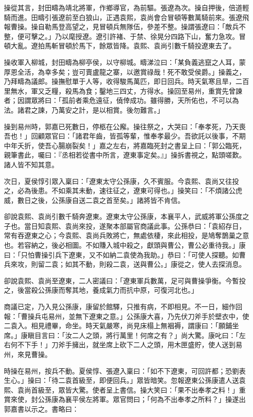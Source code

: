 操從其言，封田疇為靖北將軍，作鄉導官，為前驅。張遼為次。操自押後，倍道輕騎而進。田疇引張遼前至白狼山，正遇袁熙，袁尚會合冒頓等數萬騎前來。張遼飛報曹操。操自勒馬登高望之，見冒頓兵無隊伍，參差不整。操謂張遼曰：「敵兵不整，便可擊之。」乃以麾授遼。遼引許褚、于禁、徐晃分四路下山，奮力急攻。冒頓大亂。遼拍馬斬冒頓於馬下，餘眾皆降。袁熙、袁尚引數千騎投遼東去了。

操收軍入柳城，封田疇為柳亭侯，以守柳城。疇涕泣曰：「某負義逃竄之人耳，蒙厚恩全活，為幸多矣；豈可賣盧龍之寨，以邀賞祿哉！死不敢受侯爵。」操義之，乃拜疇為議郎。操撫慰單于人等，收得駿馬萬匹，即日回兵。時天氣寒且旱，二百里無水，軍又乏糧，殺馬為食；鑿地三四丈，方得水。操回至易州，重賞先曾諫者；因謂眾將曰：「孤前者乘危遠征，僥倖成功。雖得勝，天所佑也，不可以為法。諸君之諫，乃萬安之計，是以相賞。後勿難言。」

操到易州時，郭嘉已死數日，停柩在公廨。操往祭之，大哭曰：「奉孝死，乃天喪吾也！」回顧眾官曰：「諸君年齒，皆孤等輩，惟奉孝最少。吾欲託以後事，不期中年夭折，使吾心腸崩裂矣！」嘉之左右，將嘉臨死封之書呈上曰：「郭公臨死，親筆書此，囑曰：『丞相若從書中所言，遼東事定矣。』」操拆書視之，點頭嗟歎。諸人皆不知其意。

次日，夏侯惇引眾入稟曰：「遼東太守公孫康，久不賓服。今袁熙、袁尚又往投之，必為後患。不如乘其未動，速往征之，遼東可得也。」操笑曰：「不煩諸公虎威，數日之後，公孫康自送二袁之首至矣。」諸將皆不肯信。

卻說袁熙、袁尚引數千騎奔遼東。遼東太守公孫康，本襄平人，武威將軍公孫度之子也。當日知袁熙、袁尚來投，遂聚本部屬官商議此事。公孫恭曰：「袁紹存日，常有吞遼東之心；今袁熙、袁尚兵敗將亡，無處依棲，來此相投，是鳩奪鵲巢之意也。若容納之，後必相圖。不如賺入城中殺之，獻頭與曹公，曹公必重待我。」康曰：「只怕曹操引兵下遼東，又不如納二袁使為我助。」恭曰：「可使人探聽。如曹兵來攻，則留二袁；如其不動，則殺二袁，送與曹公。」康從之，使人去探消息。

卻說袁熙、袁尚至遼東，二人密議曰：「遼東軍兵數萬，足可與曹操爭衡。今暫投之，後當殺公孫康而奪其地，養成氣力而抗中原，可復河北也。」

商議已定，乃入見公孫康，康留於館驛，只推有病，不即相見。不一日，細作回報：「曹操兵屯易州，並無下遼東之意。」公孫康大喜，乃先伏刀斧手於壁衣中，使二袁入。相見禮畢，命坐。時天氣嚴寒，尚見床榻上無裀褥，謂康曰：「願鋪坐席。」康瞋目言曰：「汝二人之頭，將行萬里！何席之有？」尚大驚。康叱曰：「左右何不下手！」刀斧手擁出，就坐席上砍下二人之頭，用木匣盛貯，使人送到易州，來見曹操。

時操在易州，按兵不動。夏侯惇、張遼入稟曰：「如不下遼東，可回許都；恐劉表生心。」操曰：「待二袁首級至，即便回兵。」眾皆暗笑。忽報遼東公孫康遣人送袁熙、袁尚首級至，眾皆大驚。使者呈上書信。操大笑曰：「果不出奉孝之料！」重賞來使，封公孫康為襄平侯左將軍。眾官問曰；「何為不出奉孝之所料？」操遂出郭嘉書以示之。書略曰：

